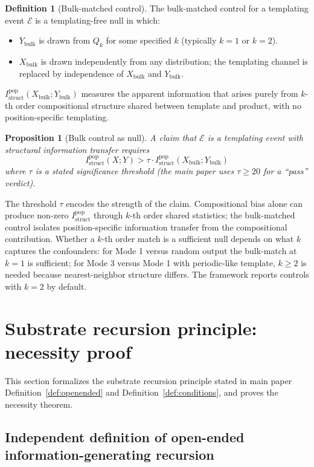\documentclass[11pt]{article}
\theoremstyle{plain}
\newtheorem{proposition}[theorem]{Proposition}
\theoremstyle{definition}
\newtheorem{definition}[theorem]{Definition}
\newcommand{\Istructpop}{I_{\mathrm{struct}}^{\mathrm{pop}}}
\begin{document}
\begin{definition}[Bulk-matched control]
The bulk-matched control for a templating event $\mathcal{E}$ is a templating-free null in which:
\begin{itemize}
  \item $Y_{\mathrm{bulk}}$ is drawn from $Q_k$ for some specified $k$ (typically $k = 1$ or $k = 2$).
  \item $X_{\mathrm{bulk}}$ is drawn independently from any distribution; the templating channel is replaced by independence of $X_{\mathrm{bulk}}$ and $Y_{\mathrm{bulk}}$.
\end{itemize}
$\Istructpop(X_{\mathrm{bulk}}; Y_{\mathrm{bulk}})$ measures the apparent information that arises purely from $k$-th order compositional structure shared between template and product, with no position-specific templating.
\end{definition}

\begin{proposition}[Bulk control as null]
A claim that $\mathcal{E}$ is a templating event with structural information transfer requires
\[
\Istructpop(X; Y) > \tau \cdot \Istructpop(X_{\mathrm{bulk}}; Y_{\mathrm{bulk}})
\]
where $\tau$ is a stated significance threshold (the main paper uses $\tau \ge 20$ for a ``pass'' verdict).
\end{proposition}

The threshold $\tau$ encodes the strength of the claim. Compositional bias alone can produce non-zero $\Istructpop$ through $k$-th order shared statistics; the bulk-matched control isolates position-specific information transfer from the compositional contribution. Whether a $k$-th order match is a sufficient null depends on what $k$ captures the confounders: for Mode 1 versus random output the bulk-match at $k = 1$ is sufficient; for Mode 3 versus Mode 1 with periodic-like template, $k \ge 2$ is needed because nearest-neighbor structure differs. The framework reports controls with $k = 2$ by default.


\section{Substrate recursion principle: necessity proof}
\label{sec:principle_proof}

This section formalizes the substrate recursion principle stated in main paper Definition~\ref{def:openended} and Definition~\ref{def:conditions}, and proves the necessity theorem.

\subsection{Independent definition of open-ended information-generating recursion}
\end{document}
